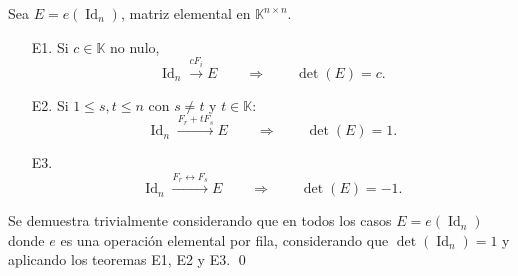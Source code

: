 \documentclass[handout]{beamer} %
\newcommand{\Id}{\operatorname{Id}}
\newcommand{\K}{\mathbb K}
\begin{document}

\begin{frame}
    	
    \begin{corolario} Sea $E=e(\Id_n)$, matriz elemental en $\K^{n \times n}$. \pause
        \begin{enumerate}
            \item[{\color{blue} E1.}]  Si $c\in\K$ no nulo, 
            $$
            \Id_n \stackrel{{cF_i}}{\longrightarrow} E \qquad \Rightarrow   \qquad     \det(E)=c.
            $$\pause
            \item[{\color{blue} E2.}]
            Si $ 1 \le s , t \le n$ con $s\ne t$ y  $t\in\K$: 
            $$
            \Id_n \stackrel{{F_r+tF_s}}{\longrightarrow} E  \qquad \Rightarrow   \qquad \det(E)=1.
            $$
              \pause
            \item[{\color{blue} E3.}]  
            $$
            \Id_n \stackrel{{F_r \leftrightarrow F_s}}{\longrightarrow} E  \qquad \Rightarrow   \qquad \det(E)=-1.$$ 
        \end{enumerate}
\end{corolario}

\pause
\begin{demostracion}
	Se  demuestra trivialmente considerando que en todos los casos $E=e(\Id_n)$ donde $e$  es una operación elemental por fila,  considerando  que $\det(\Id_n)=1$  y aplicando los teoremas E1, E2 y E3. \qed
\end{demostracion}
\end{frame}
\end{document}
